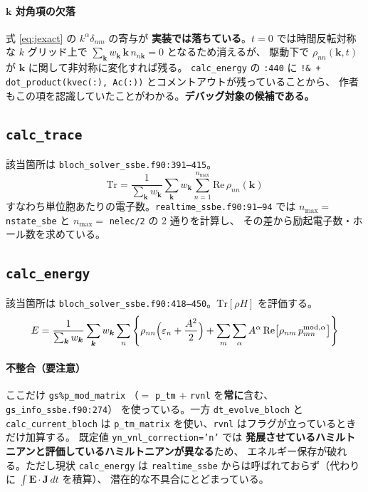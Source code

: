 \documentclass[dvipdfmx,a4paper,11pt]{jsarticle}
\newcommand{\file}[1]{\texttt{#1}}
\newcommand{\vk}{\bm{k}}
\newcommand{\Tr}{\mathrm{Tr}}
\newcommand{\Real}{\mathrm{Re}}
\newcommand{\eps}{\varepsilon}
\begin{document}
\paragraph{$\vk$ 対角項の欠落}
式 \eqref{eq:jexact} の $k^\alpha \delta_{nm}$ の寄与が
\textbf{実装では落ちている}。$t=0$ では時間反転対称な $k$ グリッド上で
$\sum_{\vk} w_{\vk}\, \vk\, n_{n\vk} = 0$ となるため消えるが、
駆動下で $\rho_{nn}(\vk,t)$ が $\vk$ に関して非対称に変化すれば残る。
\verb|calc_energy| の \file{:440} に
\verb|!& + dot_product(kvec(:), Ac(:))| とコメントアウトが残っていることから、
作者もこの項を認識していたことがわかる。\textbf{デバッグ対象の候補である。}

\subsection{\texttt{calc\_trace}}

該当箇所は \file{bloch\_solver\_ssbe.f90:391--415}。
%
\begin{equation}
  \Tr = \frac{1}{\sum_{\vk} w_{\vk}} \sum_{\vk} w_{\vk}
        \sum_{n=1}^{n_{\max}} \Real\, \rho_{nn}(\vk)
  \label{eq:trace}
\end{equation}
%
すなわち単位胞あたりの電子数。\file{realtime\_ssbe.f90:91--94} では
$n_{\max} = $ \file{nstate\_sbe} と $n_{\max} = $ \file{nelec/2} の 2 通りを計算し、
その差から励起電子数・ホール数を求めている。

\subsection{\texttt{calc\_energy}}
\label{sec:energy}

該当箇所は \file{bloch\_solver\_ssbe.f90:418--450}。$\Tr[\rho H]$ を評価する。
%
\begin{equation}
  E = \frac{1}{\sum_{\vk} w_{\vk}} \sum_{\vk} w_{\vk} \sum_{n}
      \left\{
        \rho_{nn}\Bigl(\eps_n + \frac{A^2}{2}\Bigr)
        + \sum_{m}\sum_{\alpha} A^\alpha\,
          \Real\bigl[\rho_{nm}\, p^{\mathrm{mod},\alpha}_{mn}\bigr]
      \right\}
  \label{eq:energy}
\end{equation}

\paragraph{不整合（要注意）}
ここだけ \file{gs\%p\_mod\_matrix}
（$= $ \file{p\_tm} $+$ \file{rvnl} を\textbf{常に}含む、\file{gs\_info\_ssbe.f90:274}）
を使っている。一方 \verb|dt_evolve_bloch| と \verb|calc_current_bloch| は
\file{p\_tm\_matrix} を使い、\file{rvnl} はフラグが立っているときだけ加算する。
既定値 \file{yn\_vnl\_correction='n'} では
\textbf{発展させているハミルトニアンと評価しているハミルトニアンが異なる}ため、
エネルギー保存が破れる。ただし現状 \verb|calc_energy| は
\file{realtime\_ssbe} からは呼ばれておらず（代わりに $\int \bm{E}\cdot\bm{J}\,dt$ を積算）、
潜在的な不具合にとどまっている。
\end{document}
